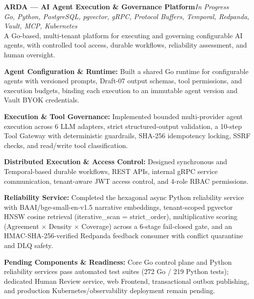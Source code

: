 \documentclass[10pt,a4paper]{article}
\begin{document}
\noindent\textbf{ARDA --- AI Agent Execution \& Governance Platform}\hfill\textit{In Progress} \enspace\textbar{}\\[1.5pt]
\noindent\textit{Go, Python, PostgreSQL, pgvector, gRPC, Protocol Buffers, Temporal, Redpanda, Vault, MCP, Kubernetes}\\[2.5pt]
A Go-based, multi-tenant platform for executing and governing configurable AI agents, with controlled tool access, durable workflows, reliability assessment, and human oversight.
\begin{resumelist}
  \item \textbf{Agent Configuration \& Runtime:} Built a shared Go runtime for configurable agents with versioned prompts, Draft-07 output schemas, tool permissions, and execution budgets, binding each execution to an immutable agent version and Vault BYOK credentials.
  \item \textbf{Execution \& Tool Governance:} Implemented bounded multi-provider agent execution across 6 LLM adapters, strict structured-output validation, a 10-step Tool Gateway with deterministic guardrails, SHA-256 idempotency locking, SSRF checks, and read/write tool classification.
  \item \textbf{Distributed Execution \& Access Control:} Designed synchronous and Temporal-based durable workflows, REST APIs, internal gRPC service communication, tenant-aware JWT access control, and 4-role RBAC permissions.
  \item \textbf{Reliability Service:} Completed the hexagonal async Python reliability service with BAAI/\allowbreak{}bge-small-en-v1.5 narrative embeddings, tenant-scoped pgvector HNSW cosine retrieval (iterative\_scan = strict\_order), multiplicative scoring (Agreement $\times$ Density $\times$ Coverage) across a 6-stage fail-closed gate, and an HMAC-SHA-256-verified Redpanda feedback consumer with conflict quarantine and DLQ safety.
  \item \textbf{Pending Components \& Readiness:} Core Go control plane and Python reliability services pass automated test suites (272 Go / 219 Python tests); dedicated Human Review service, web Frontend, transactional outbox publishing, and production Kubernetes/observability deployment remain pending.
\end{resumelist}
\end{document}
